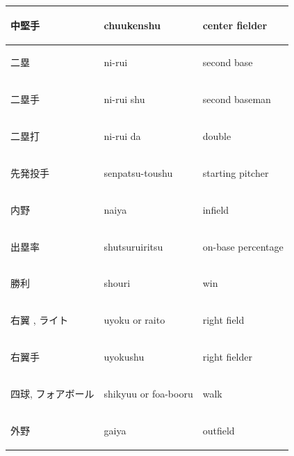 \begin{table}[!ht]
\begin{center}
\begin{tabular}{lll}
			\begin{CJK}{UTF8}{min}中堅手 \end{CJK} &chuukenshu                     & center fielder      \\\hline
			\begin{CJK}{UTF8}{min}二塁 \end{CJK} &ni-rui                          & second base         \\\hline
			\begin{CJK}{UTF8}{min}二塁手 \end{CJK} &ni-rui shu                     & second baseman      \\\hline
			\begin{CJK}{UTF8}{min}二塁打 \end{CJK} &ni-rui da                      & double              \\\hline
			\begin{CJK}{UTF8}{min}先発投手 \end{CJK} &senpatsu-toushu               & starting pitcher    \\\hline
			\begin{CJK}{UTF8}{min}内野 \end{CJK} &naiya                           & infield             \\\hline
			\begin{CJK}{UTF8}{min}出塁率 \end{CJK} &shutsuruiritsu                 & on-base percentage  \\\hline
			\begin{CJK}{UTF8}{min}勝利 \end{CJK} &shouri                          & win                 \\\hline
			\begin{CJK}{UTF8}{min}右翼 , ライト \end{CJK} &uyoku or raito            & right field         \\\hline
			\begin{CJK}{UTF8}{min}右翼手 \end{CJK} &uyokushu                       & right fielder       \\\hline
			\begin{CJK}{UTF8}{min}四球, フォアボール \end{CJK} &shikyuu or foa-booru    & walk                \\\hline
			\begin{CJK}{UTF8}{min}外野 \end{CJK} &gaiya                           & outfield            \\\hline

\end{tabular}
\end{center}
\end{table}

